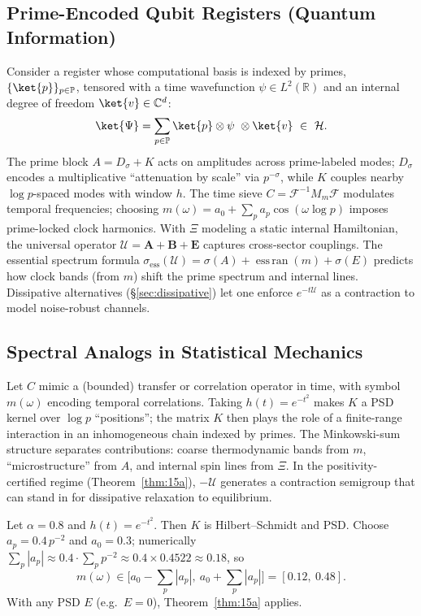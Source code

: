 \documentclass[10pt]{article}
\DeclareMathOperator{\EssRan}{ess\,ran}
\newcommand{\PP}{\mathbb{P}}
\newcommand{\RR}{\mathbb{R}}
\newcommand{\CC}{\mathbb{C}}
\begin{document}
\subsection{Prime-Encoded Qubit Registers (Quantum Information)}
Consider a register whose computational basis is indexed by primes, 
$\{\ket{p}\}_{p\in\PP}$, tensored with a time wavefunction $\psi\in L^2(\RR)$ and an internal degree of freedom $\ket{v}\in\CC^d$:
\[
\ket{\Psi}=\sum_{p\in\PP}\ket{p}\otimes \psi\ \otimes \ket{v}\ \in\ \mathcal H.
\]
The prime block \(A=D_\sigma+K\) acts on amplitudes across prime-labeled modes; 
\(D_\sigma\) encodes a multiplicative “attenuation by scale” via \(p^{-\sigma}\), while \(K\) couples nearby \(\log p\)-spaced modes with window \(h\).
The time sieve \(C=\mathcal F^{-1}M_m\mathcal F\) modulates temporal frequencies; choosing 
\(m(\omega)=a_0+\sum_p a_p\cos(\omega\log p)\) imposes prime-locked clock harmonics.
With $\Xi$ modeling a static internal Hamiltonian, the universal operator
\(
\mathcal U=\mathbf A+\mathbf B+\mathbf E
\)
captures cross-sector couplings. 
The essential spectrum formula
\(
\sigma_{\mathrm{ess}}(\mathcal U)=\sigma(A)+\EssRan(m)+\sigma(E)
\)
predicts how clock bands (from $m$) shift the prime spectrum and internal lines. 
Dissipative alternatives (\S\ref{sec:dissipative}) let one enforce $e^{-t\mathcal U}$ as a contraction to model noise-robust channels.

\subsection{Spectral Analogs in Statistical Mechanics}
Let $C$ mimic a (bounded) transfer or correlation operator in time, with symbol $m(\omega)$ encoding temporal correlations. 
Taking \(h(t)=e^{-t^2}\) makes \(K\) a PSD kernel over \(\log p\) “positions”; 
the matrix \(K\) then plays the role of a finite-range interaction in an inhomogeneous chain indexed by primes. 
The Minkowski-sum structure separates contributions: coarse thermodynamic bands from \(m\), “microstructure” from \(A\), and internal spin lines from \(\Xi\).
In the positivity-certified regime (Theorem~\ref{thm:15a}), 
\(-\mathcal U\) generates a contraction semigroup that can stand in for dissipative relaxation to equilibrium.

\begin{example}
Let $\alpha=0.8$ and $h(t)=e^{-t^2}$. Then $K$ is Hilbert--Schmidt and PSD.
Choose $a_p=0.4\,p^{-2}$ and $a_0=0.3$; numerically $\sum_{p}|a_p|\approx 0.4\cdot \sum_{p}p^{-2}\approx 0.4\times 0.4522\approx 0.18$,
so
\[
m(\omega)\in\big[a_0-\!\sum_p|a_p|,\ a_0+\!\sum_p|a_p|\big]=[0.12,\ 0.48].
\]
With any PSD $E$ (e.g.\ $E=0$), Theorem~\ref{thm:15a} applies.
\end{example}
\end{document}
